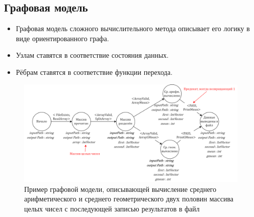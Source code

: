 \subsection{Графовая модель}
\begin{frame}
	\begin{itemize}
		\item Графовая модель сложного вычислительного метода описывает его логику в виде ориентированного графа.
		\item Узлам ставятся в соответствие состояния данных.
		\item Рёбрам ставятся в соответствие функции перехода.
	\end{itemize}

	\begin{figure}
		\centering
		\includegraphics[width=\textwidth]{images/illustration.graph.png}
		\caption{Пример графовой модели, описывающей вычисление среднего арифметического и среднего геометрического двух половин массива целых чисел с последующей записью результатов в файл}
	\end{figure}

\end{frame}

